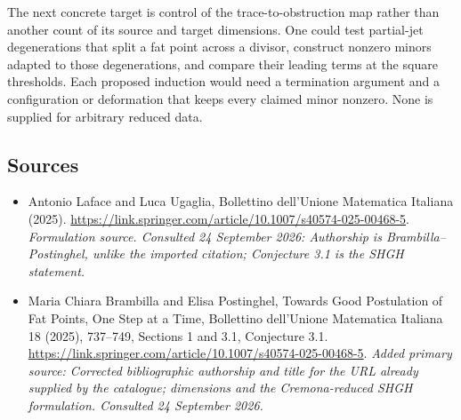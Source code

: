 \documentclass[11pt]{article}
\begin{document}
The next concrete target is control of the trace-to-obstruction map rather
than another count of its source and target dimensions. One could test
partial-jet degenerations that split a fat point across a divisor, construct
nonzero minors adapted to those degenerations, and compare their leading
terms at the square thresholds. Each proposed induction would need a
termination argument and a configuration or deformation that keeps every
claimed minor nonzero. None is supplied for arbitrary reduced data.

\subsection{Sources}
\begin{itemize}
\item[S1]Antonio Laface and Luca Ugaglia, Bollettino dell'Unione Matematica Italiana (2025).
\url{https://link.springer.com/article/10.1007/s40574-025-00468-5}.
\textit{Formulation source. Consulted 24 September 2026: Authorship is Brambilla–Postinghel, unlike the imported citation; Conjecture 3.1 is the SHGH statement.}
\item[E1]Maria Chiara Brambilla and Elisa Postinghel, Towards Good Postulation of Fat Points, One Step at a Time, Bollettino dell’Unione Matematica Italiana 18 (2025), 737–749, Sections 1 and 3.1, Conjecture 3.1.
\url{https://link.springer.com/article/10.1007/s40574-025-00468-5}.
\textit{Added primary source: Corrected bibliographic authorship and title for the URL already supplied by the catalogue; dimensions and the Cremona-reduced SHGH formulation. Consulted 24 September 2026.}
\end{itemize}
\end{document}
